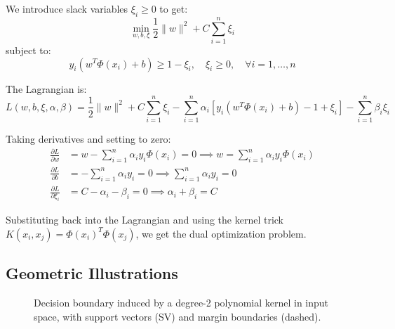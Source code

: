 \documentclass[11pt]{article}
\begin{document}
We introduce slack variables $\xi_i \geq 0$ to get:
\[
\min_{w,b,\xi} \frac{1}{2}\|w\|^2 + C\sum_{i=1}^n \xi_i
\]
subject to:
\[
y_i(w^T\Phi(x_i) + b) \geq 1 - \xi_i, \quad \xi_i \geq 0, \quad \forall i=1,\ldots,n
\]

The Lagrangian is:
\[
L(w,b,\xi,\alpha,\beta) = \frac{1}{2}\|w\|^2 + C\sum_{i=1}^n \xi_i - \sum_{i=1}^n \alpha_i[y_i(w^T\Phi(x_i) + b) - 1 + \xi_i] - \sum_{i=1}^n \beta_i\xi_i
\]

Taking derivatives and setting to zero:
\begin{align}
\frac{\partial L}{\partial w} &= w - \sum_{i=1}^n \alpha_i y_i \Phi(x_i) = 0 \implies w = \sum_{i=1}^n \alpha_i y_i \Phi(x_i)\\
\frac{\partial L}{\partial b} &= -\sum_{i=1}^n \alpha_i y_i = 0 \implies \sum_{i=1}^n \alpha_i y_i = 0\\
\frac{\partial L}{\partial \xi_i} &= C - \alpha_i - \beta_i = 0 \implies \alpha_i + \beta_i = C
\end{align}

Substituting back into the Lagrangian and using the kernel trick $K(x_i,x_j) = \Phi(x_i)^T\Phi(x_j)$, we get the dual optimization problem.

\subsection{Geometric Illustrations}
\begin{figure}[h]
  \centering
  \caption{Decision boundary induced by a degree-2 polynomial kernel in input space, with support vectors (SV) and margin boundaries (dashed).}
\end{figure}
\end{document}
